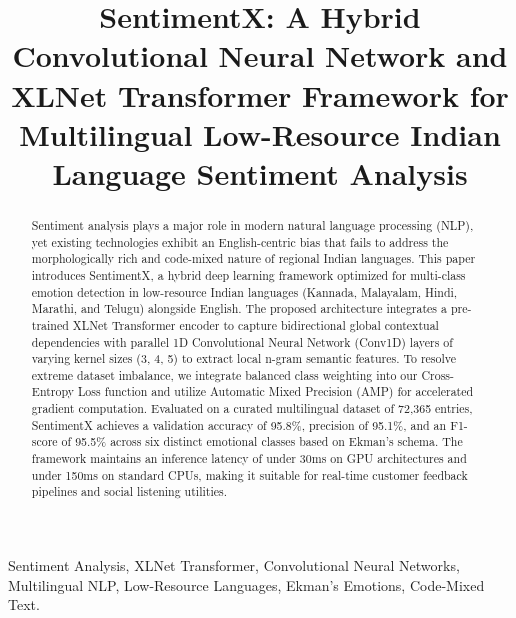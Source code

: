\documentclass[conference]{IEEEtran}
\begin{document}
\title{SentimentX: A Hybrid Convolutional Neural Network and XLNet Transformer Framework for Multilingual Low-Resource Indian Language Sentiment Analysis\\
}

\author{
}

\maketitle

\begin{abstract}
Sentiment analysis plays a major role in modern natural language processing (NLP), yet existing technologies exhibit an English-centric bias that fails to address the morphologically rich and code-mixed nature of regional Indian languages. This paper introduces SentimentX, a hybrid deep learning framework optimized for multi-class emotion detection in low-resource Indian languages (Kannada, Malayalam, Hindi, Marathi, and Telugu) alongside English. The proposed architecture integrates a pre-trained XLNet Transformer encoder to capture bidirectional global contextual dependencies with parallel 1D Convolutional Neural Network (Conv1D) layers of varying kernel sizes (3, 4, 5) to extract local n-gram semantic features. To resolve extreme dataset imbalance, we integrate balanced class weighting into our Cross-Entropy Loss function and utilize Automatic Mixed Precision (AMP) for accelerated gradient computation. Evaluated on a curated multilingual dataset of 72,365 entries, SentimentX achieves a validation accuracy of 95.8\%, precision of 95.1\%, and an F1-score of 95.5\% across six distinct emotional classes based on Ekman's schema. The framework maintains an inference latency of under 30ms on GPU architectures and under 150ms on standard CPUs, making it suitable for real-time customer feedback pipelines and social listening utilities.
\end{abstract}

\begin{IEEEkeywords}
Sentiment Analysis, XLNet Transformer, Convolutional Neural Networks, Multilingual NLP, Low-Resource Languages, Ekman's Emotions, Code-Mixed Text.
\end{IEEEkeywords}
\end{document}

